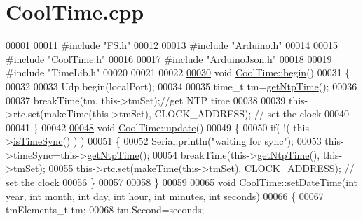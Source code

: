 \hypertarget{_cool_time_8cpp_source}{}\section{Cool\+Time.\+cpp}

\begin{DoxyCode}
00001 
00011 \textcolor{preprocessor}{#include "FS.h"}
00012 
00013 \textcolor{preprocessor}{#include "Arduino.h"}
00014 
00015 \textcolor{preprocessor}{#include "\hyperlink{_cool_time_8h}{CoolTime.h}"}
00016 
00017 \textcolor{preprocessor}{#include "ArduinoJson.h"}
00018 
00019 \textcolor{preprocessor}{#include "TimeLib.h"}
00020 
00021 
00022 
\hyperlink{class_cool_time_ab1976cf718b950bc31e003c3323b8adb}{00030} \textcolor{keywordtype}{void} \hyperlink{class_cool_time_ab1976cf718b950bc31e003c3323b8adb}{CoolTime::begin}()
00031 \{
00032 
00033     Udp.begin(localPort);
00034 
00035     time\_t tm=\hyperlink{class_cool_time_a41fbbbfd651c2079f54d4b2911e4c705}{getNtpTime}();
00036 
00037     breakTime(tm, this->tmSet);\textcolor{comment}{//get NTP time}
00038 
00039     this->rtc.set(makeTime(this->tmSet), CLOCK\_ADDRESS); \textcolor{comment}{// set the clock}
00040     
00041 \}
00042 
\hyperlink{class_cool_time_aae601f795452cfa48d9fb337aed483a8}{00048} \textcolor{keywordtype}{void} \hyperlink{class_cool_time_aae601f795452cfa48d9fb337aed483a8}{CoolTime::update}()
00049 \{
00050     \textcolor{keywordflow}{if}( !( this->\hyperlink{class_cool_time_a5ae038a4498602b189f76a10bf02adf8}{isTimeSync}() ) )
00051     \{
00052         Serial.println(\textcolor{stringliteral}{"waiting for sync"});
00053         this->timeSync=this->\hyperlink{class_cool_time_a41fbbbfd651c2079f54d4b2911e4c705}{getNtpTime}();
00054         breakTime(this->\hyperlink{class_cool_time_a41fbbbfd651c2079f54d4b2911e4c705}{getNtpTime}(), this->tmSet);
00055         this->rtc.set(makeTime(this->tmSet), CLOCK\_ADDRESS); \textcolor{comment}{// set the clock}
00056     \}
00057     
00058 \}
00059 
\hyperlink{class_cool_time_ab81ea7fdaace111aa01cc1ec84c6d297}{00065} \textcolor{keywordtype}{void} \hyperlink{class_cool_time_ab81ea7fdaace111aa01cc1ec84c6d297}{CoolTime::setDateTime}(\textcolor{keywordtype}{int} year, \textcolor{keywordtype}{int} month, \textcolor{keywordtype}{int} day, \textcolor{keywordtype}{int} hour, \textcolor{keywordtype}{int} minutes, \textcolor{keywordtype}{int} 
      seconds)
00066 \{ 
00067     tmElements\_t tm;
00068     tm.Second=seconds; 

\end{DoxyCode}
